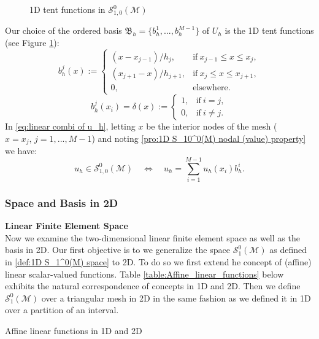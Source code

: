	\begin{figure}[!htbp]
		\centering		
		
		\caption{1D tent functions in $\mathcal{S}_{1,0}^{0}(\mathcal{M})$}
		\label{tikz:1D_tent_functions}
	\end{figure}
	Our choice of the ordered basis 
	$\mathfrak{B}_h=\{b_h^1, ..., b_h^{M-1}\}$ of $U_h$ is	the 1D tent 
	functions (see Figure \ref{tikz:1D_tent_functions}):
	\begin{equation}\label{def:1D tent functions}
	b_h^j(x) := 
	\begin{cases}
		(x-x_{j-1})/h_j, 	  & \textrm{if}\ x_{j-1}\leq x\leq x_j,\\
		(x_{j+1}-x)/h_{j+1},  & \textrm{if}\ x_{j}\leq x\leq x_{j+1},\\
		0,					  & \textrm{elsewhere}.	
	\end{cases}	
	\end{equation}	
	\begin{equation}\label{pro:1D S_10^0(M) nodal (value) property}
	b_h^j(x_i) = \delta(x) := 
	\begin{cases}
		1, 	  & \textrm{if}\  i=j,\\
		0,    & \textrm{if}\  i\neq j.
	\end{cases}	
	\end{equation}
	In \eqref{eq:linear combi of u_h}, letting $x$ be the interior nodes of 
	the mesh ($x=x_j,\,j=1,...,M-1$) and 
	noting \eqref{pro:1D S_10^0(M) nodal (value) property} we have:
	\begin{equation}
	u_h\in \mathcal{S}_{1,0}^{0}(\mathcal{M}) \quad\Leftrightarrow\quad
		u_h=\sum_{i=1}^{M-1}u_h(x_i)b_h^i.
	\end{equation}
	
	\subsubsection{Space and Basis in 2D}
	\textbf{Linear Finite Element Space}\\[8pt]
	Now we examine the two-dimensional linear finite element space as well
	as the basis in 2D. Our first objective is to we 
	generalize the space $\mathcal{S}_{1}^{0}(\mathcal{M})$ 
	as defined in \eqref{def:1D S_1^0(M) space} to 2D. To do so we first 
	extend he concept of (affine) linear scalar-valued functions. Table 
	\ref{table:Affine_linear_functions} below exhibits the natural 
	correspondence of concepts in 1D and 2D. Then we define 
	$\mathcal{S}_{1}^{0}(\mathcal{M})$ over a 
	triangular mesh in 2D in the same fashion as we defined it in 1D over a 
	partition of an interval.
	\begin{table}[!htbp]
	\begin{mdframed}[linecolor=red,linewidth=.5pt,roundcorner=10pt]
		\centering
		
		\caption{Affine linear functions in 1D and 2D}
		\label{table:Affine_linear_functions}
	\end{mdframed}
	\end{table}
	
